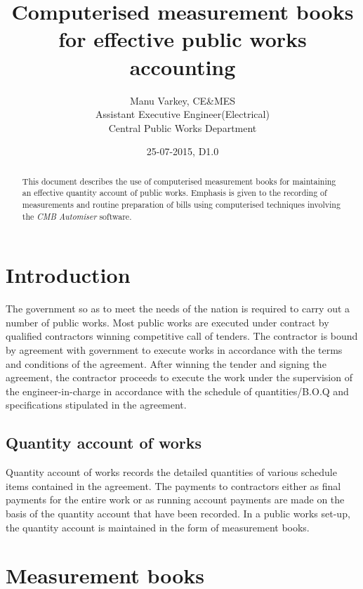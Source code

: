 \documentclass[twoside,a4paper]{refart}
\title{Computerised measurement books for effective public works accounting}
\author{Manu Varkey, CE\&MES \\
	Assistant Executive Engineer(Electrical) \\
	Central Public Works Department \\}
\date{25-07-2015, D1.0}
\begin{document}
	
	\maketitle
	
	\begin{abstract}
		This document describes the use of computerised measurement books for maintaining an effective quantity account of public works. Emphasis is given to the recording of measurements and	routine preparation of bills using computerised techniques involving the \emph{CMB Automiser} software.
	\end{abstract}
	
	\tableofcontents
	
	\newpage
	
	
	
	\section{Introduction}
	
	 The government so as to meet the needs of the nation is required to carry out a number of public works. Most public works are executed under contract by qualified contractors winning competitive call of tenders. The contractor is bound by agreement with government to execute works in accordance with the terms and conditions of the agreement. After winning the tender and signing the agreement, the contractor proceeds to execute the work under the supervision of the engineer-in-charge in accordance with the schedule of quantities/B.O.Q and specifications stipulated in the agreement.
	 
	 \subsection{Quantity account of works}
	 
	 Quantity account of works records the detailed quantities of various schedule items contained in the agreement. The payments to contractors either as final payments for the entire work or as running account payments are made on the basis of the quantity account that have been recorded. In a public works set-up, the quantity account is maintained in the form of measurement books.
	 
	 \section{Measurement books}
	 
\end{document}
